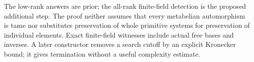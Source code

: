The low-rank answers are prior; the all-rank finite-field detection is
the proposed additional step. The proof neither assumes that every
metabelian automorphism is tame nor substitutes preservation of whole
primitive systems for preservation of individual elements. Exact
finite-field witnesses include actual free bases and inverses. A later
constructor removes a search cutoff by an explicit Kronecker bound;
it gives termination without a useful complexity estimate.
